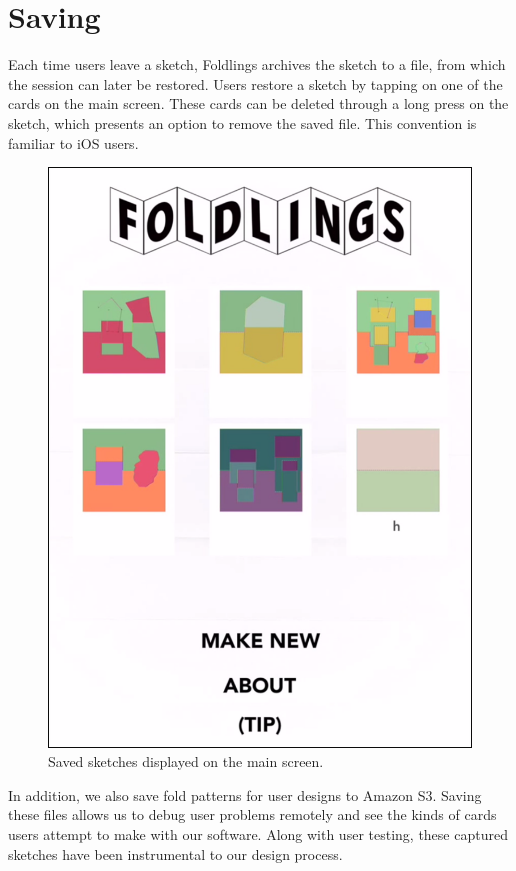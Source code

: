 \section{Saving}\label{saving}

Each time users leave a sketch, Foldlings archives the sketch to a file,
from which the session can later be restored. Users restore a sketch by
tapping on one of the cards on the main screen. These cards can be
deleted through a long press on the sketch, which presents an option to
remove the saved file. This convention is familiar to iOS users.

\begin{figure}[htbp]
\centering
\includegraphics{figures/34_UI_Saving/saved_sketches.png}
\caption{Saved sketches displayed on the main screen.}
\end{figure}

In addition, we also save fold patterns for user designs to Amazon S3.
Saving these files allows us to debug user problems remotely and see the
kinds of cards users attempt to make with our software. Along with user
testing, these captured sketches have been instrumental to our design
process.
